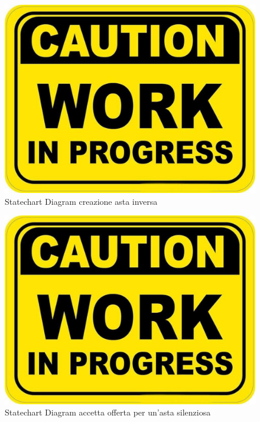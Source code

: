             \begin{figure}[htbp!]
            \centering
                \includegraphics[width=0.1\linewidth]{Immagini/WorkInProgress.pdf}
            \caption{Statechart Diagram creazione asta inversa}
            \end{figure}
            
            \begin{figure}[htbp!]
            \centering
                \includegraphics[width=0.1\linewidth]{Immagini/WorkInProgress.pdf}
            \caption{Statechart Diagram accetta offerta per un'asta silenziosa}
            \end{figure}